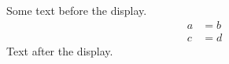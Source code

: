 \documentclass[12pt]{article}
\begin{document}
Some text before the display.
\begin{align} a &= b \\ c &= d \nonumber \end{align}
Text after the display.
\end{document}
